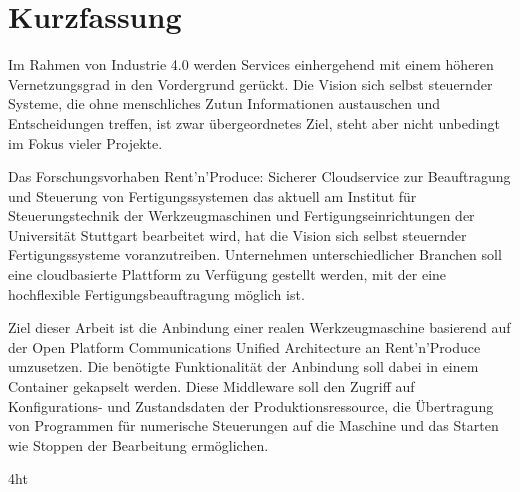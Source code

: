 \documentclass[
a4paper,
twoside,
bibliography=totoc,
headsepline,
cleardoublepage=empty,
parskip=half,
draft=false
]{scrbook}
\begin{document}
	\newpage
	
	\section*{Kurzfassung}
	
		Im Rahmen von Industrie 4.0 werden Services einhergehend mit einem höheren Vernetzungsgrad in den Vordergrund gerückt. Die Vision sich selbst steuernder Systeme, die ohne menschliches Zutun Informationen austauschen und Entscheidungen treffen, ist zwar übergeordnetes Ziel, steht aber nicht unbedingt im Fokus vieler Projekte.
		
		Das Forschungsvorhaben \glqq Rent'n'Produce: Sicherer Cloudservice zur Beauftragung und Steuerung von Fertigungssystemen\grqq{} das aktuell am Institut für Steuerungstechnik der Werkzeugmaschinen und Fertigungseinrichtungen der Universität Stuttgart bearbeitet wird, hat die Vision sich selbst steuernder Fertigungssysteme voranzutreiben. Unternehmen unterschiedlicher Branchen soll eine cloudbasierte Plattform zu Verfügung gestellt werden, mit der eine hochflexible Fertigungsbeauftragung möglich ist.
		
		Ziel dieser Arbeit ist die Anbindung einer realen Werkzeugmaschine basierend auf der Open Platform Communications Unified Architecture an Rent'n'Produce umzusetzen. Die benötigte Funktionalität der Anbindung soll dabei in einem Container gekapselt werden. Diese Middleware soll den Zugriff auf Konfigurations- und Zustandsdaten der Produktionsressource, die Übertragung von Programmen für numerische Steuerungen auf die Maschine und das Starten wie Stoppen der Bearbeitung ermöglichen.
	
	\cleardoublepage
	
	
	\iftex4ht
	\else
	\fi
	
	
	\tableofcontents
	
	
\end{document}
